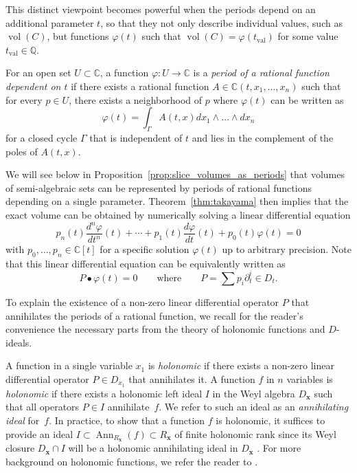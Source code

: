\documentclass[sigconf, nonacm]{acmart} %
\DeclareMathOperator{\vol}{vol}
\newcommand{\val}[0]{{\operatorname{val}}}
\begin{document}
This distinct viewpoint becomes powerful when the periods depend on an additional parameter $t$, so that they not only describe individual values, such as $\vol(C)$, but functions $\varphi(t)$ such that $\vol(C)=\varphi(t_{\val})$ for some value $t_{\val} \in \mathbb{Q}$.

\begin{definition}
    For an open set $U \subset \mathbb{C}$, a function 
    $\varphi :U\to \mathbb{C}$ 
    is a {\em {period of a rational function dependent on $t$}} if there exists a rational function $A \in \mathbb{C}(t,x_1,\ldots, x_n)$ such that for every $p \in U$, there exists a neighborhood of $p$ where $\varphi(t)$ can be written as 
\begin{equation}\label{eq:vol}
    \varphi(t) = \int_{\Gamma} A(t,x) dx_1\wedge \ldots \wedge dx_n 
\end{equation}
    for a closed cycle $\Gamma$ that is independent of $t$ and lies in the complement of the poles of $A(t,x)$.
\end{definition}

We will see below in Proposition~\ref{prop:slice_volumes_as_periods} that volumes of semi-algebraic sets can be represented by periods of rational functions depending on a single parameter. Theorem~\ref{thm:takayama} then implies that the exact volume can be obtained by numerically solving a linear differential equation
\begin{equation*}
    p_n(t)\frac{d^n\varphi}{dt^n}(t) + \cdots + p_1(t)\frac{d\varphi}{dt}(t) + p_0(t) \varphi(t)= 0 
\end{equation*}
with $p_0,\ldots, p_n \in \mathbb{C}[t]$ for a specific solution $\varphi(t)$ up to arbitrary precision. Note that this linear differential equation can be equivalently written as 
\begin{equation*}
    P \bullet \varphi(t)= 0 \qquad \text{where} \qquad P = \sum p_i\partial^i_t \in D_t .
\end{equation*}

To explain the existence of a non-zero linear differential operator $P$ that annihilates the periods of a rational function, we recall for the reader's convenience the necessary parts from the theory of holonomic functions and $D$-ideals.

A function in a single variable $x_1$ is {\em holonomic} if there exists a non-zero linear differential operator $P \in D_{x_1}$ that annihilates it. A function $f$ in $n$ variables is {\em holonomic} if there exists a holonomic left ideal $I$ \cite[Def. 1.4.8]{SST} in the Weyl algebra $D_\mathbf{x}$ such that all operators $P \in I$ annihilate~$f$. We refer to such an ideal as an {\em annihilating ideal} for~$f$. In practice, to show that a function $f$ is holonomic, it suffices to provide an ideal $I \subset \operatorname{Ann}_{R_\mathbf{x}}(f) \subset R_\mathbf{x}$ of finite holonomic rank since its Weyl closure $D_\mathbf{x} \cap I$ will be a holonomic annihilating ideal in $D_\mathbf{x}$ \cite[Thm. 1.4.15]{SST}. For more background on holonomic functions, we refer the reader to \cite{SatStu25}.
\end{document}
